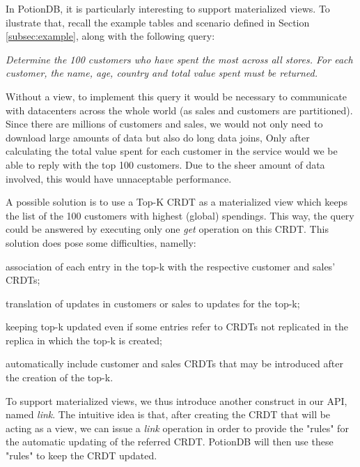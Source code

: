 \documentclass{vldb}
\begin{document}
In PotionDB, it is particularly interesting to support materialized views.
To ilustrate that, recall the example tables and scenario defined in Section \ref{subsec:example}, along with the following query: 

\emph{Determine the 100 customers who have spent the most across all stores. For each customer, the name, age, country and total value spent must be returned.}

Without a view, to implement this query it would be necessary to communicate with datacenters across the whole world (as sales and customers are partitioned). 
Since there are millions of customers and sales, we would not only need to download large amounts of data but also do long data joins,
Only after calculating the total value spent for each customer in the service would we be able to reply with the top 100 customers.
Due to the sheer amount of data involved, this would have unnaceptable performance.

A possible solution is to use a Top-K CRDT %
as a materialized view which keeps the list of the 100 customers with highest (global) spendings.
This way, the query could be answered by executing only one \emph{get} operation on this CRDT.
This solution does pose some difficulties, namelly: 
\begin{enumerate*}[label=(\roman*)]
	\item association of each entry in the top-k with the respective customer and sales' CRDTs;
	\item translation of updates in customers or sales to updates for the top-k;
	\item keeping top-k updated even if some entries refer to CRDTs not replicated in the replica in which the top-k is created;
	\item automatically include customer and sales CRDTs that may be introduced after the creation of the top-k.
\end{enumerate*}

To support materialized views, we thus introduce another construct in our API, named \emph{link}.
The intuitive idea is that, after creating the CRDT that will be acting as a view, we can issue a \emph{link} operation in order to provide the "rules" for the automatic updating of the referred CRDT.
PotionDB will then use these "rules" to keep the CRDT updated.
\end{document}
